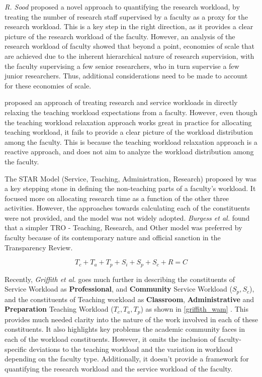 \textit{R. Sood} \cite{rohan2017} proposed a novel approach to quantifying the research workload, by treating the number of research staff supervised by a faculty as a proxy for the research workload. This is a key step in the right direction, as it provides a clear picture of the research workload of the faculty. However, an analysis of the research workload of faculty showed that beyond a point, economies of scale that are achieved due to the inherent hierarchical nature of research supervision, with the faculty supervising a few senior researchers, who in turn supervise a few junior researchers. Thus, additional considerations need to be made to account for these economies of scale.

\cite{rohan2017} proposed an approach of treating research and service workloads in directly relaxing the teaching workload expectations from a faculty. However, even though the teaching workload relaxation approach works great in practice for allocating teaching workload, it fails to provide a clear picture of the workload distribution among the faculty. This is because the teaching workload relaxation approach is a reactive approach, and does not aim to analyze the workload distribution among the faculty.

The STAR Model (Service, Teaching, Administration, Research) proposed by \cite{finlay1994management} was a key stepping stone in defining the non-teaching parts of a faculty's workload. It focused more on allocating research time as a function of the other three activities. However, the approaches towards calculating each of the constituents were not provided, and the model was not widely adopted. \textit{Burgess et al.} found that a simpler TRO - Teaching, Research, and Other model was preferred by faculty \cite{burgess2003academic} because of its contemporary nature and official sanction in the Transparency Review.

\begin{equation}
  T_c + T_a + T_p + S_i + S_p + S_c+R = C
  \label{griffith_wam}
\end{equation}

Recently, \textit{Griffith et al.} goes much further in describing the constituents of Service Workload as \textbf{Professional}, and \textbf{Community} Service Workload (\(S_p, S_c\)), and the constituents of Teaching workload as \textbf{Classroom}, \textbf{Administrative} and \textbf{Preparation} Teaching Workload (\(T_c, T_a, T_p\)) as shown in \autoref{griffith_wam} \cite{griffith2020framework}. This provides much needed clarity into the nature of the work involved in each of these constituents. It also highlights key problems the academic community faces in each of the workload constituents. However, it omits the inclusion of faculty-specific deviations to the teaching workload and the variation in workload depending on the faculty type. Additionally, it doesn't provide a framework for quantifying the research workload and the service workload of the faculty.

